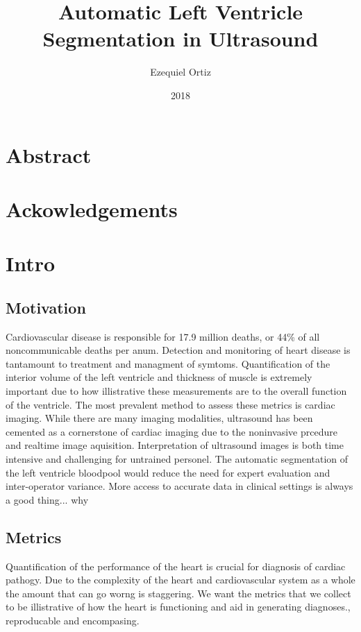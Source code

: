 \documentclass{article}
\title{Automatic Left Ventricle Segmentation in Ultrasound}
\date{2018}
\author{Ezequiel Ortiz}
\begin{document}
\maketitle
{}
\newpage
{}
\section{Abstract}
\section{Ackowledgements}
\section{Intro}
\subsection{Motivation}
Cardiovascular disease is responsible for 17.9 million deaths, or 44\% of all noncommunicable deaths per anum\cite{who_world_health}.
Detection and monitoring of heart disease is tantamount to treatment and managment of symtoms.%
Quantification of the interior volume of the left ventricle and thickness of muscle is extremely important due to how illistrative these measurements are to the overall function of the ventricle.\cite{ase_chamber_quant}
The most prevalent method to assess these metrics is cardiac imaging.
While there are many imaging modalities, ultrasound has been cemented as a cornerstone of cardiac imaging due to the noninvasive prcedure and realtime image aquisition.
Interpretation of ultrasound images is both time intensive and challenging for untrained personel.
The automatic segmentation of the left ventricle bloodpool %
would reduce the need for expert evaluation and inter-operator variance.%
More access to accurate data in clinical settings is always a good thing... why

\subsection{Metrics}
Quantification of the performance of the heart is crucial for diagnosis of cardiac pathogy.
Due to the complexity of the heart and cardiovascular system as a whole the amount that can go worng is staggering.
We want the metrics that we collect to be illistrative of how the heart is functioning and aid in generating diagnoses.,
reproducable
and encompasing.%
\end{document}
